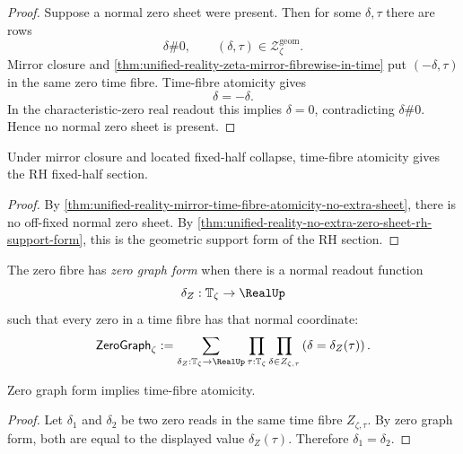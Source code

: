 \begin{proof}
Suppose a normal zero sheet were present.  Then for some $\delta,\tau$
there are rows
$$
\delta\#0,
\qquad
(\delta,\tau)\in\mathcal Z_{\zeta}^{\mathrm{geom}}.
$$
Mirror closure and
\autoref{thm:unified-reality-zeta-mirror-fibrewise-in-time} put
$(-\delta,\tau)$ in the same zero time fibre.  Time-fibre atomicity gives
$$
\delta=-\delta.
$$
In the characteristic-zero real readout this implies $\delta=0$,
contradicting $\delta\#0$.  Hence no normal zero sheet is present.
\end{proof}

\begin{corollary}
\label{cor:unified-reality-time-fibre-atomicity-gives-rh-section}
Under mirror closure and located fixed-half collapse, time-fibre
atomicity gives the RH fixed-half section.
\end{corollary}

\begin{proof}
By
\autoref{thm:unified-reality-mirror-time-fibre-atomicity-no-extra-sheet},
there is no off-fixed normal zero sheet.  By
\autoref{thm:unified-reality-no-extra-zero-sheet-rh-support-form}, this
is the geometric support form of the RH section.
\end{proof}

\begin{definition}
\label{def:unified-reality-zero-graph-form}
The zero fibre has \emph{zero graph form} when there is a normal readout
function
$$
\delta_Z:\mathbb T_{\zeta}\to\RealUp
$$
such that every zero in a time fibre has that normal coordinate:
$$
\mathsf{ZeroGraph}_{\zeta}
:=
\sum_{\delta_Z:\mathbb T_{\zeta}\to\RealUp}
\prod_{\tau:\mathbb T_{\zeta}}
\prod_{\delta\in Z_{\zeta,\tau}}
\left(
\delta=\delta_Z(\tau)
\right).
$$
\end{definition}

\begin{theorem}
\label{thm:unified-reality-zero-graph-form-implies-time-fibre-atomicity}
Zero graph form implies time-fibre atomicity.
\end{theorem}

\begin{proof}
Let $\delta_1$ and $\delta_2$ be two zero reads in the same time fibre
$Z_{\zeta,\tau}$.  By zero graph form, both are equal to the displayed
value $\delta_Z(\tau)$.  Therefore $\delta_1=\delta_2$.
\end{proof}

